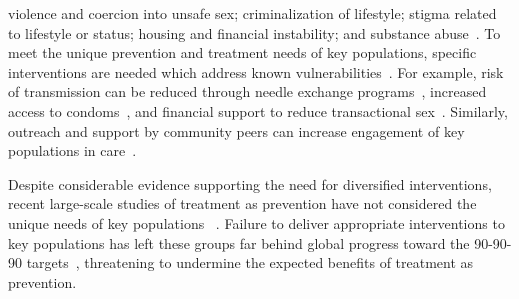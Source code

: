 violence and coercion into unsafe sex;
criminalization of lifestyle;
stigma related to lifestyle or \hiv status;
housing and financial instability;
and substance abuse~\cite{Mountain2014, WHO2014HIVKP}.
To meet the unique \hiv prevention and treatment needs of key populations,
specific interventions are needed which
address known vulnerabilities~\cite{WHO2014HIVKP}.
For example, risk of \hiv transmission can be reduced through
needle exchange programs~\cite{Kurth2011},
increased access to condoms~\cite{TBD},
and financial support to reduce transactional sex~\cite{Pettifor2012}.
Similarly, outreach and support by community peers
can increase engagement of key populations in \hiv care~\cite{WHO2014HIVKP}.
\par
Despite considerable evidence supporting the need for diversified \hiv interventions,
recent large-scale studies of treatment as prevention
have not considered the unique needs of key populations%
~\cite{Iwuji2018,Havlir2018,Hayes2019}.
Failure to deliver appropriate interventions to key populations
has left these groups far behind global progress toward
the \mbox{90-90-90} targets~\cite{Gupta2017},
threatening to undermine the expected benefits of treatment as prevention.
